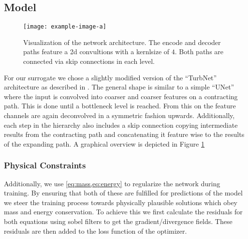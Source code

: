 \documentclass{article} %
\begin{document}



\subsection*{Model}
\begin{figure}[htb]
   \centering
   \texttt{[image: example-image-a]}
   \caption{Visualization of the network architecture. The encode and decoder paths feature a 2d convultions with a kernlsize of $4$. Both paths are connected via skip connections in each level.}
   \label{fig:arch}
\end{figure}

For our surrogate we chose a slightly modified version of the ``TurbNet'' architecture as described in \cite{turbnet}.
The general shape is similar to a simple ``UNet'' \cite{unet} where the input is convolved into coarser and coarser features on a contracting path.
This is done until a bottleneck level is reached.
From this on the feature channels are again deconvolved in a symmetric fashion upwards.
Additionally, each step in the hierarchy also includes a skip connection copying intermediate results from the contracting path and concatenating it feature wise to the results of the expanding path.
A graphical overview is depicted in Figure \ref{fig:arch}





\subsubsection*{Physical Constraints}
Additionally, we use \cref{eq:mass,eq:energy} to regularize the network during training.
By ensuring that both of these are fulfilled for predictions of the model we steer the training process towards physically plausible solutions which obey mass and energy conservation.
To achieve this we first calculate the residuals for both equations using sobel filters to get the gradient/divergence fields.
These residuals are then added to the loss function of the optimizer.
\end{document}
